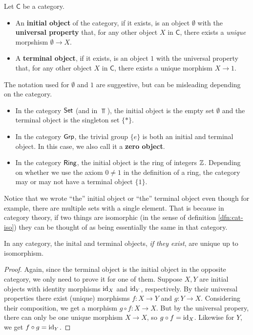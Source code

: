 \begin{dfn}[]
	Let $\textsf{C}$ be a category.
	\begin{itemize}
		\item An \textbf{initial object} of the category, if it exists, is an object $\emptyset$ with the \textbf{universal property} that, for any other object $X$ in $\textsf{C}$, there exists a \emph{unique} morpshism $\emptyset \to X$.
		\item A \textbf{terminal object}, if it exists, is an object $1$ with the universal property that, for any other object $X$ in $\textsf{C}$, there exists a unique morphism $X \to 1$.
	\end{itemize}
\end{dfn}
\begin{ex}[]
The notation used for $\emptyset$ and $1$ are suggestive, but can be misleading depending on the category.
\begin{itemize}
	\item In the category $\text{\sffamily Set}$ (and in $\Top$), the initial object is the empty set $\emptyset$ and the terminal object is the singleton set $\{\ast\}$.
	\item In the category $\text{\sffamily Grp}$, the trivial group $\{e\}$ is both an initial and terminal object. In this case, we also call it a \textbf{zero object}.
	\item In the category $\text{\sffamily Ring}$, the initial object is the ring of integers $\mathbb{Z}$. 
		Depending on whether we use the axiom $0 \neq 1$ in the definition of a ring, the category may or may not have a terminal object $\{1\}$.
\end{itemize}
\end{ex}
Notice that we wrote ``the'' initial object or ``the'' terminal object even though for example, there are multiple sets with a single element. 
That is because in category theory, if two things are isomorphic (in the sense of definition \ref{dfn:cat-iso}) they can be thought of as being essentially the same in that category.
\begin{lem}[] \label{lem:unique-iso}
	In any category, the inital and terminal objects, \emph{if they exist}, are unique up to isomorphism.
\end{lem}
\begin{proof}
	Again, since the terminal object is the initial object in the opposite category, we only need to prove it for one of them.
	Suppose $X,Y$ are initial objects with identity morphisms $\operatorname{id}_X$ and $\operatorname{id}_Y$, respectively.
	By their universal properties there exist (unique) morphisms $f: X \to Y$ and $g: Y \to X$. 
	Considering their composition, we get a morphism $g \circ f: X \to X$.
	But by the universal propery, there can only be one unique morphism $X \to X$, so $g \circ f = \operatorname{id}_X$.
	Likewise for $Y$, we get $f \circ g = \operatorname{id}_Y$.
\end{proof}

